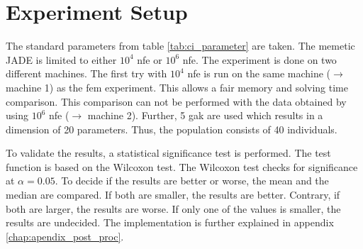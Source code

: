 \documentclass[./\jobname.tex]{subfiles}
\begin{document}
\section{Experiment Setup}
The standard parameters from table \ref{tab:ci_parameter} are taken. The memetic JADE is limited to either $10^4$ \gls{nfe} or $10^6$ \gls{nfe}. The experiment is done on two different machines. The first try with $10^4$ \gls{nfe} is run on the same machine ($\rightarrow$ machine 1) as the \gls{fem} experiment. This allows a fair memory and solving time comparison. This comparison can not be performed with the data obtained by using $10^6$ \gls{nfe} ($\rightarrow$ machine 2). Further, 5 \gls{gak} are used which results in a dimension of 20 parameters. Thus, the population consists of 40 individuals. 

To validate the results, a statistical significance test is performed. The test function is based on the Wilcoxon test. The Wilcoxon test checks for significance at $\alpha = 0.05$. To decide if the results are better or worse, the mean and the median are compared. If both are smaller, the results are better. Contrary, if both are larger, the results are worse. If only one of the values is smaller, the results are undecided. The implementation is further explained in appendix \ref{chap:apendix_post_proc}. 
\end{document}
